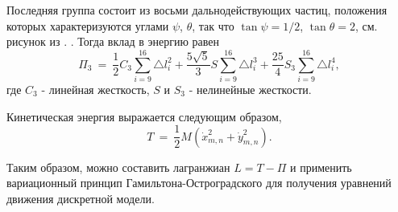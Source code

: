 Последняя группа состоит из восьми дальнодействующих частиц, положения которых характеризуются углами $\psi$, $\theta$, так что $\tan \psi = 1/2$, $\tan \theta=2$, см. рисунок из \cite{porkros}. . Тогда вклад в энергию равен
$$
\Pi_3~=~\frac{1}{2} C_3 \sum_{i=9}^{16}\triangle l_i^2+\frac{5\sqrt{5}}{3} S \sum_{i=9}^{16}\triangle l_i^3+\frac{25}{4} S_3 \sum_{i=9}^{16}\triangle l_i^4,
$$
где $C_3$ - линейная жесткость, $S$ и $S_3$ - нелинейные жесткости.

Кинетическая энергия выражается следующим образом,
\[
T~=~\frac{1}{2} M\left(\dot{x}_{m,n}^2+\dot{y}_{m,n}^2\right).
\]

Таким образом, можно составить лагранжиан $L = T- \Pi$ и применить вариационный принцип Гамильтона-Остроградского для получения уравнений движения дискретной модели.%


